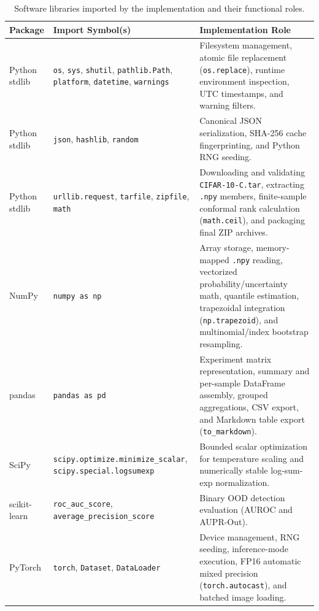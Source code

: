 \documentclass[11pt,a4paper]{article}
\begin{document}
\begin{table}[!htbp]
\centering
\caption{Software libraries imported by the implementation and their functional roles.}
\label{tab:dependencies}
\begin{tabularx}{\textwidth}{L{0.16\textwidth} L{0.28\textwidth} Y}
\toprule
\textbf{Package} & \textbf{Import Symbol(s)} & \textbf{Implementation Role} \\
\midrule
Python stdlib & \texttt{os}, \texttt{sys}, \texttt{shutil}, \texttt{pathlib.\allowbreak{}Path}, \texttt{platform}, \texttt{datetime}, \texttt{warnings} & Filesystem management, atomic file replacement (\texttt{os.\allowbreak{}replace}), runtime environment inspection, UTC timestamps, and warning filters. \\
Python stdlib & \texttt{json}, \texttt{hashlib}, \texttt{random} & Canonical JSON serialization, SHA-256 cache fingerprinting, and Python RNG seeding. \\
Python stdlib & \texttt{urllib.\allowbreak{}request}, \texttt{tarfile}, \texttt{zipfile}, \texttt{math} & Downloading and validating \texttt{CIFAR-10-C.\allowbreak{}tar}, extracting \texttt{.\allowbreak{}npy} members, finite-sample conformal rank calculation (\texttt{math.\allowbreak{}ceil}), and packaging final ZIP archives. \\
NumPy & \texttt{numpy as np} & Array storage, memory-mapped \texttt{.\allowbreak{}npy} reading, vectorized probability/uncertainty math, quantile estimation, trapezoidal integration (\texttt{np.\allowbreak{}trapezoid}), and multinomial/index bootstrap resampling. \\
pandas & \texttt{pandas as pd} & Experiment matrix representation, summary and per-sample DataFrame assembly, grouped aggregations, CSV export, and Markdown table export (\texttt{to\_\allowbreak{}markdown}). \\
SciPy & \texttt{scipy.\allowbreak{}optimize.\allowbreak{}minimize\_\allowbreak{}scalar}, \texttt{scipy.\allowbreak{}special.\allowbreak{}logsumexp} & Bounded scalar optimization for temperature scaling and numerically stable log-sum-exp normalization. \\
scikit-learn & \texttt{roc\_\allowbreak{}auc\_\allowbreak{}score}, \texttt{average\_\allowbreak{}precision\_\allowbreak{}score} & Binary OOD detection evaluation (AUROC and AUPR-Out). \\
PyTorch & \texttt{torch}, \texttt{Dataset}, \texttt{DataLoader} & Device management, RNG seeding, inference-mode execution, FP16 automatic mixed precision (\texttt{torch.\allowbreak{}autocast}), and batched image loading. \\

\end{tabularx}
\end{table}
\end{document}
